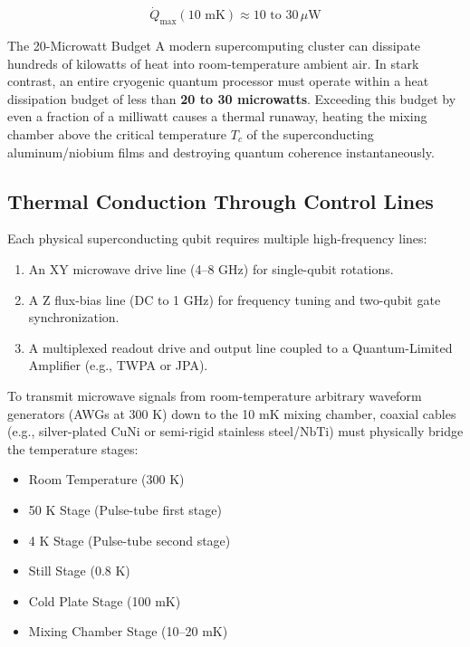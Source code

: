 \begin{equation}
    \dot{Q}_{\text{max}}(10\text{ mK}) \approx 10\text{ to }30\,\mu\text{W}
\end{equation}

\begin{hardwarebox}{The 20-Microwatt Budget}
A modern supercomputing cluster can dissipate hundreds of kilowatts of heat into room-temperature ambient air. In stark contrast, an entire cryogenic quantum processor must operate within a heat dissipation budget of less than \textbf{20 to 30 microwatts}. Exceeding this budget by even a fraction of a milliwatt causes a thermal runaway, heating the mixing chamber above the critical temperature $T_c$ of the superconducting aluminum/niobium films and destroying quantum coherence instantaneously.
\end{hardwarebox}

\subsection{Thermal Conduction Through Control Lines}
Each physical superconducting qubit requires multiple high-frequency lines:
\begin{enumerate}
    \item An XY microwave drive line (4--8 GHz) for single-qubit rotations.
    \item A Z flux-bias line (DC to 1 GHz) for frequency tuning and two-qubit gate synchronization.
    \item A multiplexed readout drive and output line coupled to a Quantum-Limited Amplifier (e.g., TWPA or JPA).
\end{enumerate}

To transmit microwave signals from room-temperature arbitrary waveform generators (AWGs at 300 K) down to the 10 mK mixing chamber, coaxial cables (e.g., silver-plated CuNi or semi-rigid stainless steel/NbTi) must physically bridge the temperature stages:
\begin{itemize}
    \item Room Temperature (300 K)
    \item 50 K Stage (Pulse-tube first stage)
    \item 4 K Stage (Pulse-tube second stage)
    \item Still Stage (0.8 K)
    \item Cold Plate Stage (100 mK)
    \item Mixing Chamber Stage (10--20 mK)
\end{itemize}

